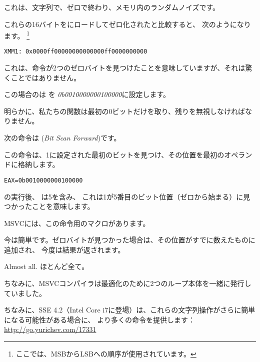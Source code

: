 これは、文字列で、ゼロで終わり、メモリ内のランダムノイズです。

これらの16バイトをにロードしてゼロ化されたと比較すると、
次のようになります。
\footnote{ここでは、\ac{MSB}から\ac{LSB}への順序が使用されています。}

\begin{verbatim}
XMM1: 0x0000ff00000000000000ff0000000000
\end{verbatim}

これは、命令が2つのゼロバイトを見つけたことを意味していますが、それは驚くことではありません。
 
この場合のは \EAX を
\emph{0b0010000000100000}に設定します。

明らかに、私たちの関数は最初の0ビットだけを取り、残りを無視しなければなりません。

\label{instruction_BSF}
次の命令は (\emph{Bit Scan Forward})です。

この命令は、1に設定された最初のビットを見つけ、その位置を最初のオペランドに格納します。

\begin{verbatim}
EAX=0b0010000000100000
\end{verbatim}

の実行後、 \EAX は5を含み、
これは1が5番目のビット位置（ゼロから始まる）に見つかったことを意味します。

MSVCには、この命令用のマクロがあります。

今は簡単です。ゼロバイトが見つかった場合は、その位置がすでに数えたものに追加され、
今度は結果が返されます。

Almost all.
ほとんど全て。

ちなみに、MSVCコンパイラは最適化のために2つのループ本体を一緒に発行していました。

ちなみに、SSE 4.2（Intel Core i7に登場）は、これらの文字列操作がさらに簡単になる可能性がある場合に、
より多くの命令を提供します：\url{http://go.yurichev.com/17331}
